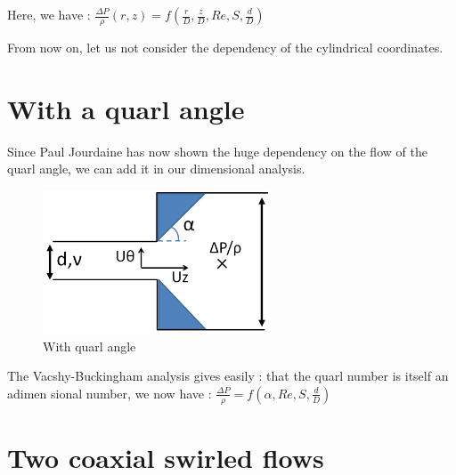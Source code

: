 Here, we have : $\frac{\Delta P}{\rho}(r,z)=f(\frac{r}{D},\frac{z}{D},Re,S,\frac{d}{D})$

From now on, let us not consider the dependency of the cylindrical coordinates.

\section{With a quarl angle}

Since Paul Jourdaine \cite{paul_jourdaine_nom_effect_2016} has now shown the huge dependency on the flow of the quarl angle, we can add it in our dimensional analysis.

\begin{figure}[!h]
  \centering
\includegraphics[width=0.6\textwidth]{fig/Schema_Vashy3.png}
  \caption{With quarl angle}
 \label{Vaschy3}
\end{figure}

The Vacshy-Buckingham analysis gives easily : that the quarl number is itself an adimen
sional number, we now have :
$\frac{\Delta P}{\rho}=f(\alpha,Re,S,\frac{d}{D})$

\section{Two coaxial swirled flows}

